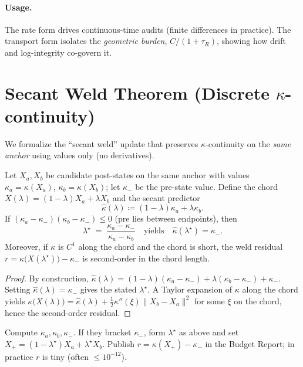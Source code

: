 \paragraph{Usage.}
The rate form drives continuous-time audits (finite differences in practice). The transport form isolates the \emph{geometric burden}, \(C/(1+\tau_{R})\), showing how drift and log-integrity co-govern it.

\section{Secant Weld Theorem (Discrete \texorpdfstring{\(\kappa\)}{kappa}-continuity)}
We formalize the “secant weld” update that preserves \(\kappa\)-continuity on the \emph{same anchor} using values only (no derivatives).

\begin{theorem}
Let \(X_a,X_b\) be candidate post-states on the same anchor with values
\(\kappa_a=\kappa(X_a)\), \(\kappa_b=\kappa(X_b)\); let \(\kappa_-\) be the pre-state value.
Define the chord \(X(\lambda)=(1-\lambda)X_a+\lambda X_b\) and the secant predictor
\[
\widehat{\kappa}(\lambda) \coloneqq (1-\lambda)\kappa_a + \lambda \kappa_b.
\]
If \((\kappa_a-\kappa_-)(\kappa_b-\kappa_-)\le 0\) (pre lies between endpoints), then
\[
\lambda^\star \;=\; \frac{\kappa_a-\kappa_-}{\kappa_a-\kappa_b}
\quad\text{yields}\quad
\widehat{\kappa}(\lambda^\star)=\kappa_-.
\]
Moreover, if \(\kappa\) is \(C^1\) along the chord and the chord is short, the weld residual
\(r=\kappa\bigl(X(\lambda^\star)\bigr)-\kappa_-\) is second-order in the chord length.
\end{theorem}

\begin{proof}
By construction,
\(\widehat{\kappa}(\lambda)=(1-\lambda)(\kappa_a-\kappa_-)+\lambda(\kappa_b-\kappa_-)+\kappa_-\).
Setting \(\widehat{\kappa}(\lambda)=\kappa_-\) gives the stated \(\lambda^\star\).
A Taylor expansion of \(\kappa\) along the chord yields
\(\kappa\bigl(X(\lambda)\bigr)=\widehat{\kappa}(\lambda)+\tfrac{1}{2}\kappa''(\xi)\|X_b-X_a\|^2\)
for some \(\xi\) on the chord, hence the second-order residual.
\end{proof}

\begin{remark}
Compute \(\kappa_a,\kappa_b,\kappa_-\). If they bracket \(\kappa_-\), form \(\lambda^\star\) as above and set
\(X_+=(1-\lambda^\star)X_a+\lambda^\star X_b\).
Publish \(r=\kappa(X_+)-\kappa_-\) in the Budget Report; in practice \(r\) is tiny (often \(\le 10^{-12}\)).
\end{remark}


